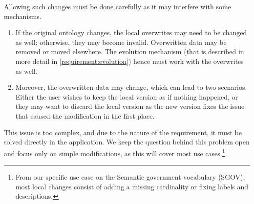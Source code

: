 Allowing such changes must be done carefully as it may interfere with some mechanisms.
\begin{enumerate}
  \item If the original ontology changes, the local overwrites may need to be changed as well; otherwise, they may become invalid. Overwritten data may be removed or moved elsewhere. The evolution mechanism (that is described in more detail in \autoref{requirement:evolution}) hence must work with the overwrites as well.
  \item Moreover, the overwritten data may change, which can lead to two scenarios. Either the user wishes to keep the local version as if nothing happened, or they may want to discard the local version as the new version fixes the issue that caused the modification in the first place.
\end{enumerate}

This issue is too complex, and due to the nature of the requirement, it must be solved directly in the application. We keep the question behind this problem open and focus only on simple modifications, as this will cover most use cases.\footnote{From our specific use case on the Semantic government vocabulary (SGOV), most local changes consist of adding a missing cardinality or fixing labels and descriptions.}